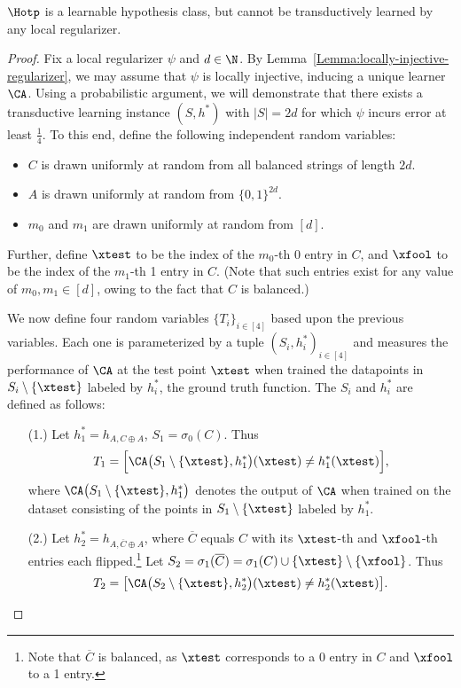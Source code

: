 \begin{theorem}\label{Theorem:local-regularization-fails}
$\Hotp$ is a learnable hypothesis class, but cannot be transductively learned by any local regularizer.
\end{theorem}
\begin{proof}
Fix a local regularizer $\psi$ and $d \in \N$. By Lemma~\ref{Lemma:locally-injective-regularizer}, we may assume that $\psi$ is locally injective, inducing a unique learner $\CA$. Using a probabilistic argument, we will demonstrate that there exists a transductive learning instance $(S, h^*)$ with $|S| = 2d$ for which $\psi$ incurs error at least $\frac{1}{4}$. To this end, define the following independent random variables: 
\begin{itemize}
    \itemsep 0em
    \item $C$ is drawn uniformly at random from all balanced strings of length $2d$. 
    \item $A$ is drawn uniformly at random from $\{0, 1\}^{2d}$. 
    \item $m_0$ and $m_1$ are drawn uniformly at random from $[d]$. 
\end{itemize}
Further, define $\xtest$ to be the index of the $m_0$-th 0 entry in $C$, and $\xfool$ to be the index of the $m_1$-th 1 entry in $C$. (Note that such entries exist for any value of $m_0, m_1 \in [d]$, owing to the fact that $C$ is balanced.) 

We now define four random variables $\{T_i\}_{i \in [4]}$ based upon the previous variables. Each one is parameterized by a tuple $(S_i, h^*_i)_{i \in [4]}$ and measures the performance of $\CA$ at the test point $\xtest$ when trained the datapoints in $S_{i} \setminus \{\xtest\}$ labeled by $h^*_i$, the ground truth function. The $S_i$ and $h^*_i$ are defined as follows: 

\begin{itemize}
    \item[(1.)] Let $h^*_{1} = h_{A, C \oplus A}$, $S_1 = \sigma_0(C)$. Thus 
    \[  T_1 = \Big[\CA\big(S_1 \setminus \{\xtest\}, h^*_1\big)(\xtest) \neq h^*_1(\xtest) \Big],  \]
    where $\CA\big(S_1 \setminus \{\xtest\}, h^*_1\big)$ denotes the output of $\CA$ when trained on the dataset consisting of the points in $S_1 \setminus \{\xtest\}$ labeled by $h^*_1$. 
    
    \item[(2.)] Let $h^*_2 = h_{A, \overline{C} \oplus A}$, where $\overline{C}$ equals $C$ with its $\xtest$-th and $\xfool$-th entries each flipped.\footnote{Note that $\overline{C}$ is balanced, as $\xtest$ corresponds to a 0 entry in $C$ and $\xfool$ to a 1 entry.} Let $S_2 = \sigma_1(\overline{C}) = \sigma_1(C) \cup \{\xtest\} \setminus \{\xfool\}$. Thus 
    \[ T_2 = \big[\CA\big(S_2 \setminus \{\xtest\}, h^*_2\big)(\xtest) \neq h^*_2(\xtest) \big]. \]  
    

\end{itemize}
\end{proof}
